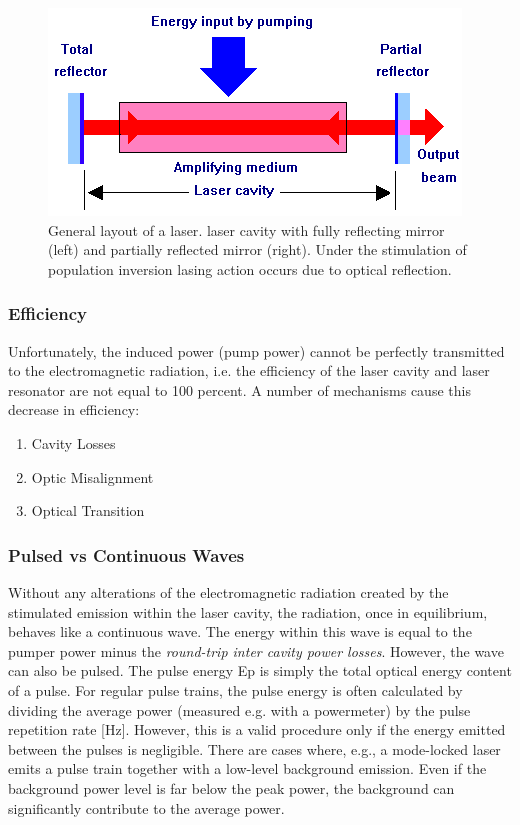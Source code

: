 \begin{figure}[ht!]
\centering
\includegraphics[scale=0.6]{chapters/img/laser cavity.png}
\caption{General layout of a \acs{laser}. \acs{laser} cavity with fully reflecting mirror (left) and partially reflected mirror (right). Under the stimulation of population inversion lasing action occurs due to optical reflection.}
\label{fig:laser_cavity}
\end{figure}

	\subsubsection{Efficiency}
Unfortunately, the induced power (pump power) cannot be perfectly transmitted to the electromagnetic radiation, i.e. the efficiency of the \acs{laser} cavity and \acs{laser} resonator are not equal to 100 percent. A number of mechanisms cause this decrease in efficiency:
	\begin{enumerate}
		\item{Cavity Losses}
		\item{Optic Misalignment}
		\item{Optical Transition}
	\end{enumerate} 

	\subsubsection{Pulsed vs Continuous Waves}
Without any alterations of the electromagnetic radiation created by the stimulated emission within the \acs{laser} cavity, the radiation, once in equilibrium, behaves like a continuous wave. The energy within this wave is equal to the pumper power minus the \textit{round-trip inter cavity power losses}. However, the wave can also be pulsed. The pulse energy Ep is simply the total optical energy content of a pulse. For regular pulse trains, the pulse energy is often calculated by dividing the average power (measured e.g. with a powermeter) by the pulse repetition rate [Hz]. However, this is a valid procedure only if the energy emitted between the pulses is negligible. There are cases where, e.g., a mode-locked laser emits a pulse train together with a low-level background emission. Even if the background power level is far below the peak power, the background can significantly contribute to the average power. 

